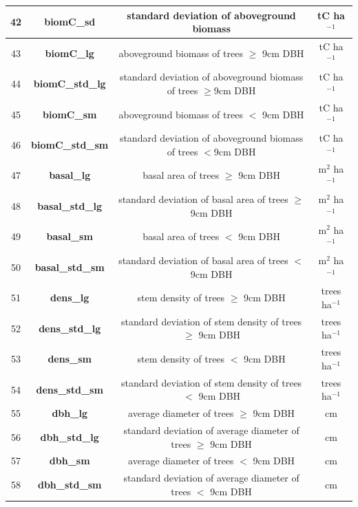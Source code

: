 \documentclass[a4paper, 12pt] {article}
\begin{document}
\begin{table} [H]
{\begin{tabular}{|c|c|c|c|}
\hline 
42 & \textbf{biomC\_sd} & standard deviation of aboveground biomass & tC ha$^{-1}$ \\
\hline 
43 & \textbf{biomC\_lg} & aboveground biomass of trees $\geq$ 9cm DBH & tC ha$^{-1}$ \\
\hline 
44 & \textbf{biomC\_std\_lg} & standard deviation of aboveground biomass of trees $\geq$9cm DBH & tC ha$^{-1}$ \\
\hline 
45 & \textbf{biomC\_sm} & aboveground biomass of trees $<$ 9cm DBH & tC ha$^{-1}$ \\
\hline 
46 & \textbf{biomC\_std\_sm} & standard deviation of aboveground biomass of trees $<$9cm DBH & tC ha$^{-1}$ \\
\hline 
47 & \textbf{basal\_lg} & basal area of trees $\geq$ 9cm DBH & m$^2$ ha$^{-1}$ \\
\hline 
48 & \textbf{basal\_std\_lg} & standard deviation of basal area of trees $\geq$ 9cm DBH & m$^2$  ha$^{-1}$ \\
\hline 
49 & \textbf{basal\_sm} & basal area of trees $<$ 9cm DBH & m$^2$  ha$^{-1}$ \\
\hline 
50 & \textbf{basal\_std\_sm} & standard deviation of basal area of trees $<$9cm DBH & m$^2$  ha$^{-1}$ \\
\hline 
51 & \textbf{dens\_lg} & stem density of trees $\geq$ 9cm DBH & trees ha$^{-1}$ \\
\hline 
52 & \textbf{dens\_std\_lg} & standard deviation of stem density of trees $\geq$ 9cm DBH & trees  ha$^{-1}$ \\
\hline 
53 & \textbf{dens\_sm} & stem density of trees $<$ 9cm DBH & trees ha$^{-1}$ \\
\hline 
54 & \textbf{dens\_std\_sm} & standard deviation of stem density of trees $<$ 9cm DBH & trees ha$^{-1}$ \\
\hline 
55 & \textbf{dbh\_lg} & average diameter of trees $\geq$ 9cm DBH & cm \\
\hline 
56 & \textbf{dbh\_std\_lg} & standard deviation of average diameter of trees $\geq$ 9cm DBH & cm \\
\hline 
57 & \textbf{dbh\_sm} & average diameter of trees $<$ 9cm DBH & cm \\
\hline 
58 & \textbf{dbh\_std\_sm} & standard deviation of average diameter of trees $<$ 9cm DBH & cm \\
\hline 
\end{tabular}}
\end{table}
\end{document}
